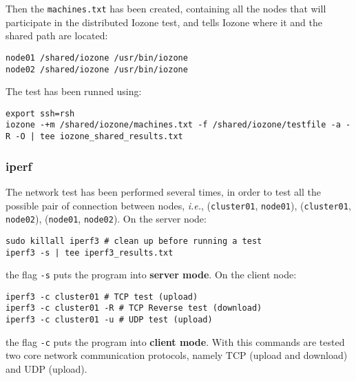Then the \texttt{machines.txt} has been created, containing all the nodes that will participate in the distributed Iozone test, and tells Iozone where it and the shared path are located:

\begin{verbatim}
node01 /shared/iozone /usr/bin/iozone 
node02 /shared/iozone /usr/bin/iozone
\end{verbatim}

The test has been runned using:

\begin{verbatim}
export ssh=rsh
iozone -+m /shared/iozone/machines.txt -f /shared/iozone/testfile -a -R -O | tee iozone_shared_results.txt
\end{verbatim}

\subsubsection{iperf}

The network test has been performed several times, in order to test all the possible pair of connection between nodes, \textit{i.e.}, (\texttt{cluster01}, \texttt{node01}), (\texttt{cluster01}, \texttt{node02}), (\texttt{node01}, \texttt{node02}).
On the server node:

\begin{verbatim}
sudo killall iperf3 # clean up before running a test
iperf3 -s | tee iperf3_results.txt
\end{verbatim}
the flag \texttt{-s} puts the program into \textbf{server mode}. On the client node:

\begin{verbatim}
iperf3 -c cluster01 # TCP test (upload)
iperf3 -c cluster01 -R # TCP Reverse test (download)
iperf3 -c cluster01 -u # UDP test (upload)
\end{verbatim}

the flag \texttt{-c} puts the program into \textbf{client mode}. With this commands are tested two core network communication protocols, namely TCP (upload and download) and UDP (upload).